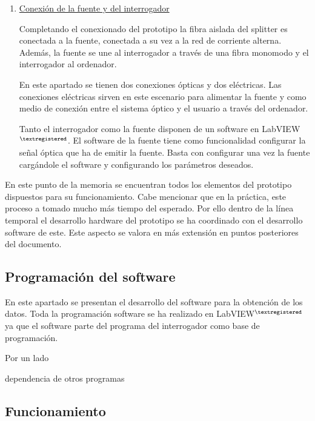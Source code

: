 \begin{itemize}
\begin{enumerate}
	
	\item \underline{Conexión de la fuente y del interrogador}
	
	Completando el conexionado del prototipo la fibra aislada del splitter es conectada a la fuente, conectada a su vez a la red de corriente alterna. Además, la fuente se une al interrogador a través de una fibra monomodo y el interrogador al ordenador. 
	
	En este apartado se tienen dos conexiones ópticas y dos eléctricas. Las conexiones eléctricas sirven en este escenario para alimentar la fuente y como medio de conexión entre el sistema óptico y el usuario a través del ordenador. 
	
	Tanto el interrogador como la fuente disponen de un software en LabVIEW$^{\textregistered}$. El software de la fuente tiene como funcionalidad configurar la señal óptica que ha de emitir la fuente. Basta con configurar una vez la fuente cargándole el software y configurando los parámetros deseados. 
	
		
	\end{enumerate}
	 
	
\end{itemize}

En este punto de la memoria se encuentran todos los elementos del prototipo dispuestos para su funcionamiento. Cabe mencionar que en la práctica, este proceso a tomado mucho más tiempo del esperado. Por ello dentro de la línea temporal el desarrollo hardware del prototipo se ha coordinado con el desarrollo software de este. Este aspecto se valora en más extensión en puntos posteriores del documento. 



\subsection{Programación del software}
\label{sec:programacion}

En este apartado se presentan el desarrollo del software para la obtención de los datos. Toda la programación software se ha realizado en LabVIEW$^{\textregistered}$ ya que el software parte del programa del interrogador como base de programación.

Por un lado 

dependencia de otros programas


\subsection{Funcionamiento}
\label{sec:funcionamiento3}


